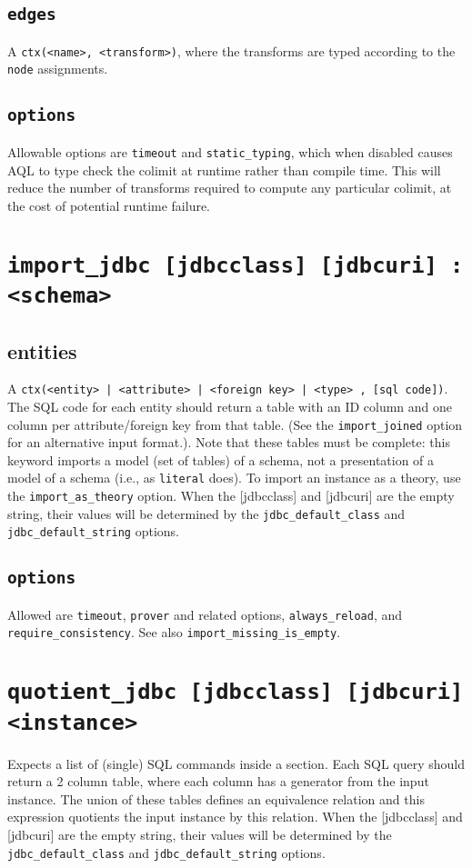 \documentclass[10pt]{book}
\begin{document}
\subsection{{\tt edges}}
A {\tt ctx(<name>, <transform>)}, where the transforms are typed according to the {\tt node} assignments.

\subsection{{\tt options}}
Allowable options are {\tt timeout} and {\tt static\_typing}, which when disabled causes AQL to type check the colimit at runtime rather than compile time.  This will reduce the number of transforms required to compute any particular colimit, at the cost of potential runtime failure.

\section{{\tt import\_jdbc [jdbcclass] [jdbcuri] : <schema>}}

\subsection{entities}
A {\tt ctx(<entity> | <attribute> | <foreign key> | <type> , [sql code])}.  The SQL code for each entity should return a table with an ID column and one column per attribute/foreign key from that table.  (See the {\tt import\_joined} option for an alternative input format.). Note that these tables must be complete: this keyword imports a model (set of tables) of a schema, not a presentation of a model of a schema (i.e., as {\tt literal} does).  To import an instance as a theory, use the {\tt import\_as\_theory} option.  When the [jdbcclass] and [jdbcuri] are the empty string, their values will be determined by the {\tt jdbc\_default\_class} and {\tt jdbc\_default\_string} options.  

\subsection{{\tt options}}
Allowed are {\tt timeout}, {\tt prover} and related options, {\tt always\_reload}, and {\tt require\_consistency}.  See also {\tt import\_missing\_is\_empty}.


\section{{\tt quotient\_jdbc [jdbcclass] [jdbcuri] <instance>}}
Expects a list of (single) SQL commands inside a section.  Each SQL query should return a 2 column table, where each column has a generator from the input instance.  The union of these tables defines an equivalence relation and this expression quotients the input instance by this relation.  When the [jdbcclass] and [jdbcuri] are the empty string, their values will be determined by the {\tt jdbc\_default\_class} and {\tt jdbc\_default\_string} options.
\end{document}
